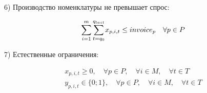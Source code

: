 \documentclass[14pt,fleqn]{extarticle}
\begin{document}
	6) Производство номенклатуры не превышает спрос:
	
	\begin{ceqn}
		\begin{align*}
			\smashoperator[r]{\sum_{i = 1}^{m}} \smashoperator[r]{\sum_{t = q_0}^{q_{last}}} x_{p,i,t} \leq invoice_p \quad \forall p \in P
		\end{align*}
	\end{ceqn}

	7) Естественные ограничения:
	
	\begin{ceqn}
		\begin{align*}
			x_{p,i,t} \geq 0, \quad \forall p \in P, \quad \forall i \in M, \quad \forall t \in T\\
			y_{p,i,t} \in \{0; 1\}, \quad \forall p \in P, \quad \forall i \in M, \quad \forall t \in T
		\end{align*}
	\end{ceqn}
\end{document}
